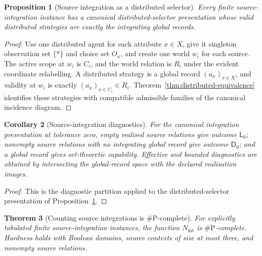 \documentclass[11pt]{article}
\theoremstyle{plain}
\newtheorem{theorem}{Theorem}[section]
\newtheorem{proposition}[theorem]{Proposition}
\newtheorem{corollary}[theorem]{Corollary}
\theoremstyle{definition}
\theoremstyle{remark}
\begin{document}
\begin{proposition}[Source integration as a distributed selector]
\label{prop:source-integration-distributed}
Every finite source-integration instance has a canonical distributed-selector
presentation whose valid distributed strategies are exactly the integrating
global records.
\end{proposition}

\begin{proof}
Use one distributed agent for each attribute $x\in X$, give it singleton
observation set $\{\ast\}$ and choice set $O_x$, and create one world $w_i$ for
each source. The active scope at $w_i$ is $C_i$, and the world relation is
$R_i$ under the evident coordinate relabelling. A distributed strategy is a
global record $(a_x)_{x\in X}$, and validity at $w_i$ is exactly
$(a_x)_{x\in C_i}\in R_i$. Theorem~\ref{thm:distributed-equivalence} identifies
these strategies with compatible admissible families of the canonical incidence
diagram.
\end{proof}

\begin{corollary}[Source-integration diagnostics]
\label{cor:source-integration-diagnostics}
For the canonical integration presentation at tolerance zero, empty realised
source relations give outcome $\mathsf L_0$; nonempty source relations with no
integrating global record give outcome $\mathsf D_0$; and a global record gives
set-theoretic capability. Effective and bounded diagnostics are obtained by
intersecting the global-record space with the declared realisation images.
\end{corollary}

\begin{proof}
This is the diagnostic partition applied to the distributed-selector
presentation of Proposition~\ref{prop:source-integration-distributed}.
\end{proof}

\begin{theorem}[Counting source integrations is $\#\mathrm P$-complete]
\label{thm:source-integration-sharpP}
For explicitly tabulated finite source-integration instances, the function
$N_{\mathrm{int}}$ is $\#\mathrm P$-complete. Hardness holds with Boolean
domains, source contexts of size at most three, and nonempty source relations.
\end{theorem}
\end{document}
